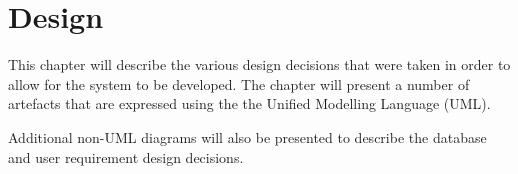 \chapter{Design}
\label{cha:design}

This chapter will describe the various design decisions that were taken in order
to allow for the system to be developed. The chapter will present a number of 
artefacts that are expressed using the the Unified Modelling Language (UML).

Additional non-UML diagrams will also be presented to describe the database and 
user requirement design decisions.

\newpage


\newpage


\newpage


\newpage


\newpage


\newpage


\newpage

